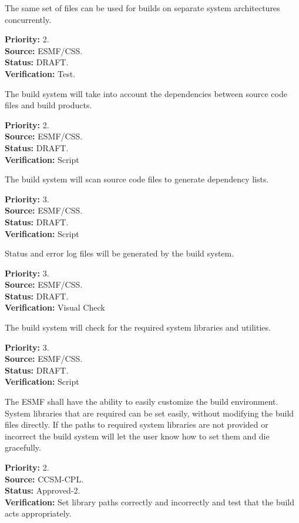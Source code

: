 The same set of files can be used for builds on separate 
system architectures concurrently.
\begin{reqlist}
{\bf Priority:} 2. \\
{\bf Source:} ESMF/CSS. \\
{\bf Status:} DRAFT. \\
{\bf Verification:} Test.
\end{reqlist}

The build system will take into account the dependencies 
between source code files and build products.  
\begin{reqlist}
{\bf Priority:} 2. \\
{\bf Source:} ESMF/CSS. \\
{\bf Status:} DRAFT. \\
{\bf Verification:} Script
\end{reqlist}

The build system will scan source code files to 
generate dependency lists.
\begin{reqlist}
{\bf Priority:} 3. \\
{\bf Source:} ESMF/CSS. \\
{\bf Status:} DRAFT. \\
{\bf Verification:} Script
\end{reqlist}

Status and error log files will be generated by 
the build system.
\begin{reqlist}
{\bf Priority:} 3. \\
{\bf Source:} ESMF/CSS. \\
{\bf Status:} DRAFT. \\
{\bf Verification:} Visual Check
\end{reqlist}

The build system will check for the required system 
libraries and utilities.
\begin{reqlist}
{\bf Priority:} 3. \\
{\bf Source:} ESMF/CSS. \\
{\bf Status:} DRAFT. \\
{\bf Verification:} Script
\end{reqlist}

The ESMF shall have the ability to easily customize the build environment. 
System libraries that are required can be set easily, without modifying 
the build files directly. If the paths to required system libraries 
are not provided or incorrect the build system will let the user know 
how to set them and die gracefully.
\begin{reqlist}
{\bf Priority:} 2. \\
{\bf Source:} CCSM-CPL. \\
{\bf Status:} Approved-2. \\
{\bf Verification:} Set library paths correctly and incorrectly and test that 
the build acts appropriately.
\end{reqlist}

